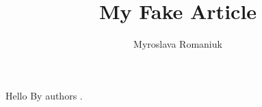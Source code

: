 \documentclass{article}
\title{My Fake Article}
\author{Myroslava Romaniuk}
\date{}
\begin{document}
    \maketitle
    Hello
    By authors \cite{Alle06a,Abde10a}.

    
    
\end{document}

